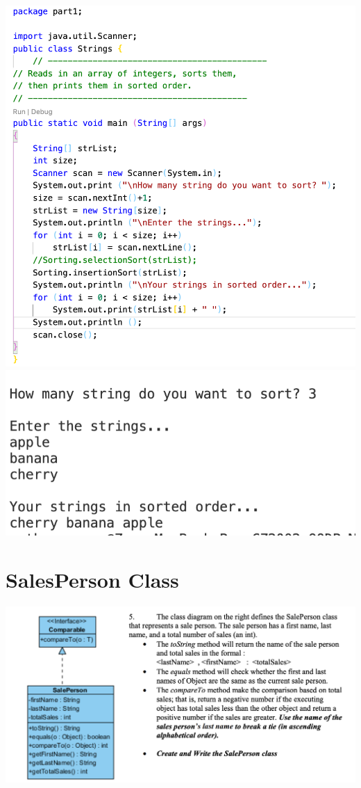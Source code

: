 \documentclass[hidelinks,12pt]{article}
\begin{document}
\includegraphics[scale=0.4]{newStrings.png}
\includegraphics[scale=0.55]{newStringR.png}

\section{SalesPerson Class}
\includegraphics[scale=0.55]{q5.png}
\end{document}
